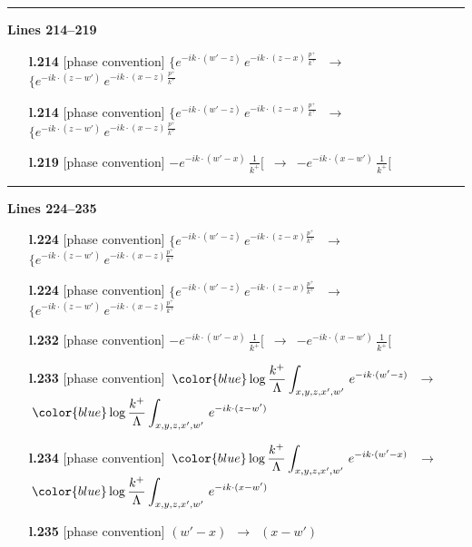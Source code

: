 \documentclass[10pt]{article}
\begin{document}
\noindent\rule{\linewidth}{0.3pt}\par\noindent\textbf{Lines 214--219} \par
\begin{itemize}[leftmargin=2.2em,itemsep=1pt,topsep=2pt]
\item[\textbf{l.214}] \textsf{\small [phase convention]} $\displaystyle \{e^{-ik\cdot(w'-z)}\,e^{-ik\cdot(z-x)\,\frac{p^{+}}{k^{+}}}\,$\ $\longrightarrow$\ $\displaystyle \{e^{-ik\cdot(z-w')}\,e^{-ik\cdot(x-z)\,\frac{p^{+}}{k^{+}}}\,$
\item[\textbf{l.214}] \textsf{\small [phase convention]} $\displaystyle \{e^{-ik\cdot(w'-z)}\,e^{-ik\cdot(z-x)\,\frac{p^{+}}{k^{+}}}\,$\ $\longrightarrow$\ $\displaystyle \{e^{-ik\cdot(z-w')}\,e^{-ik\cdot(x-z)\,\frac{p^{+}}{k^{+}}}\,$
\item[\textbf{l.219}] \textsf{\small [phase convention]} $\displaystyle -e^{-ik\cdot(w'-x)}\,\frac{1}{k^{+}}[$\ $\longrightarrow$\ $\displaystyle -e^{-ik\cdot(x-w')}\,\frac{1}{k^{+}}[$
\end{itemize}
\noindent\rule{\linewidth}{0.3pt}\par\noindent\textbf{Lines 224--235} \par
\begin{itemize}[leftmargin=2.2em,itemsep=1pt,topsep=2pt]
\item[\textbf{l.224}] \textsf{\small [phase convention]} $\displaystyle \{e^{-ik\cdot(w'-z)}\,e^{-ik\cdot(z-x)\frac{p^{+}}{k^{+}}}\,$\ $\longrightarrow$\ $\displaystyle \{e^{-ik\cdot(z-w')}\,e^{-ik\cdot(x-z)\frac{p^{+}}{k^{+}}}\,$
\item[\textbf{l.224}] \textsf{\small [phase convention]} $\displaystyle \{e^{-ik\cdot(w'-z)}\,e^{-ik\cdot(z-x)\frac{p^{+}}{k^{+}}}\,$\ $\longrightarrow$\ $\displaystyle \{e^{-ik\cdot(z-w')}\,e^{-ik\cdot(x-z)\frac{p^{+}}{k^{+}}}\,$
\item[\textbf{l.232}] \textsf{\small [phase convention]} $\displaystyle -e^{-ik\cdot(w'-x)}\,\frac{1}{k^{+}}[$\ $\longrightarrow$\ $\displaystyle -e^{-ik\cdot(x-w')}\,\frac{1}{k^{+}}[$
\item[\textbf{l.233}] \textsf{\small [phase convention]} $\displaystyle \,{\color{blue}\log\frac{k^{+}}{\Lambda}}\int_{x,y,z,x',w'}\,e^{-ik\cdot(w'-z)}\,$\ $\longrightarrow$\ $\displaystyle \,{\color{blue}\log\frac{k^{+}}{\Lambda}}\int_{x,y,z,x',w'}\,e^{-ik\cdot(z-w')}\,$
\item[\textbf{l.234}] \textsf{\small [phase convention]} $\displaystyle \,{\color{blue}\log\frac{k^{+}}{\Lambda}}\int_{x,y,z,x',w'}\,e^{-ik\cdot(w'-x)}\,$\ $\longrightarrow$\ $\displaystyle \,{\color{blue}\log\frac{k^{+}}{\Lambda}}\int_{x,y,z,x',w'}\,e^{-ik\cdot(x-w')}\,$
\item[\textbf{l.235}] \textsf{\small [phase convention]} $\displaystyle (w'-x)$\ $\longrightarrow$\ $\displaystyle (x-w')$
\end{itemize}
\end{document}

